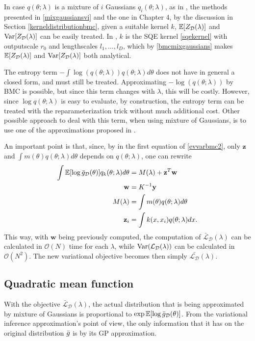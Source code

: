 In case $q(\theta;\lambda)$ is a mixture of $i$ Gaussians $q_i(\theta;\lambda)$, as in \cite{Acerbi_2018}, the methods presented in \ref{mixgaussiansvi} and the one in Chapter 4, by the discussion in Section \ref{kerneldistributionbmc}, given a suitable kernel $k$, ${\mathbb E}[Z_\mathcal{D}(\lambda)]$ and $\mathrm{Var}[Z_\mathcal{D}(\lambda)]$ can be easily treated. In \cite{Acerbi_2018}, $k$ is the SQE kernel \eqref{sqekernel} with outputscale $r_0$ and lengthscales $l_1,\ldots,l_D$, which by \eqref{bmcmixgaussians} makes ${\mathbb E}[Z_\mathcal{D}(\lambda)]$ and $\mathrm{Var}[Z_\mathcal{D}(\lambda)]$ both analytical.

The entropy term $-\int \log(q(\theta;\lambda)) q(\theta;\lambda) d\theta$ does not have in general a closed form, and must still be treated. Approximating $-\log(q(\theta;\lambda))$ by BMC is possible, but since this term changes with $\lambda$, this will be costly. However, since $\log q(\theta;\lambda)$ is easy to evaluate, by construction, the entropy term can be treated with the reparameterization trick without much additional cost. Other possible approach to deal with this term, when using mixture of Gaussians, is to use one of the approximations proposed in \cite{Huber_2008}. 

An important point is that, since, by in the first equation of \eqref{evvarbmc2}, only $\mathbf{z}$ and $\int m(\theta) q(\theta;\lambda) d\theta$ depends on $q(\theta;\lambda)$, one can rewrite
\begin{equation}
\begin{split}
\int {\mathbb E}[\log {\bar{g}}_\mathcal{D}(\theta)] q_k(\theta;\lambda) d\theta & = M(\lambda) + \mathbf{z}^T \mathbf{w} \\
\mathbf{w} & = K^{-1} \mathbf{y} \\
M(\lambda) & = \int m(\theta) q(\theta;\lambda) d\theta \\
\mathbf{z}_i & = \int k(x,x_i) q(\theta;\lambda) dx.
\end{split}
\end{equation}
This way, with $\mathbf{w}$ being previously computed, the computation of $\bar{\mathcal{L}}_\mathcal{D}(\lambda)$ can be calculated in $\mathcal{O}(N)$ time for each $\lambda$, while $\mathrm{Var}(\mathcal{L}_\mathcal{D}(\lambda))$ can be calculated in $\mathcal{O}(N^2)$. The new variational objective becomes then simply $\bar{\mathcal{L}_\mathcal{D}}(\lambda)$.

\subsection{Quadratic mean function}\label{quadmeanfnsection}
With the objective $\bar{\mathcal{L}}_\mathcal{D}(\lambda)$, the actual distribution that is being approximated by mixture of Gaussians is proportional to $\exp {\mathbb E}[\log {\bar{g}}_\mathcal{D}(\theta)]$. From the variational inference approximation's point of view, the only information that it has on the original distribution ${\bar{g}}$ is by its GP approximation. 

